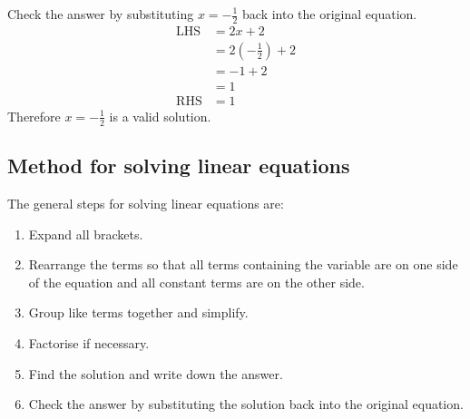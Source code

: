 Check the answer by substituting $x=-\frac{1}{2}$ back into the
original equation.
\begin{align*}
  \mbox{LHS} &= 2x+2 \\
             &= 2(-\frac{1}{2})+2 \\
	     &= -1+2 \\
	     &= 1 \\
  \mbox{RHS} &= 1
\end{align*}
Therefore $x = -\frac{1}{2}$ is a valid solution.


\subsection*{Method for solving linear equations}

The general steps for solving linear equations are:
\begin{enumerate}[noitemsep, label=\textbf{\arabic*}. ] 
    \item Expand all brackets.
    \item Rearrange the terms so that all terms containing the variable are on one side of the equation and all constant terms are on the other side.
    \item Group like terms together and simplify.
    \item Factorise if necessary.
    \item Find the solution and write down the answer.
    \item Check the answer by substituting the solution back into the original equation.
\end{enumerate}


% 

